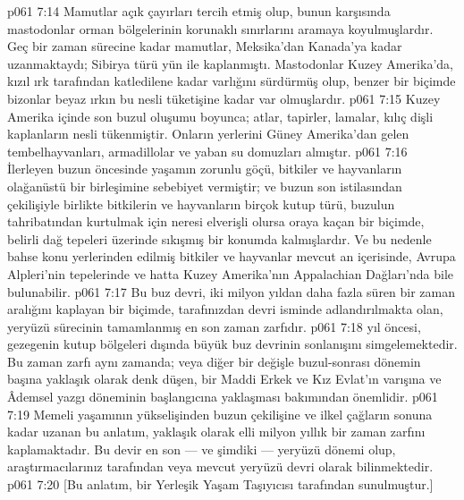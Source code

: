 \vs p061 7:14 Mamutlar açık çayırları tercih etmiş olup, bunun karşısında mastodonlar orman bölgelerinin korunaklı sınırlarını aramaya koyulmuşlardır. Geç bir zaman sürecine kadar mamutlar, Meksika’dan Kanada’ya kadar uzanmaktaydı; Sibirya türü yün ile kaplanmıştı. Mastodonlar Kuzey Amerika’da, kızıl ırk tarafından katledilene kadar varlığını sürdürmüş olup, benzer bir biçimde bizonlar beyaz ırkın bu nesli tüketişine kadar var olmuşlardır.
\vs p061 7:15 Kuzey Amerika içinde son buzul oluşumu boyunca; atlar, tapirler, lamalar, kılıç dişli kaplanların nesli tükenmiştir. Onların yerlerini Güney Amerika’dan gelen tembelhayvanları, armadillolar ve yaban su domuzları almıştır.
\vs p061 7:16 İlerleyen buzun öncesinde yaşamın zorunlu göçü, bitkiler ve hayvanların olağanüstü bir birleşimine sebebiyet vermiştir; ve buzun son istilasından çekilişiyle birlikte bitkilerin ve hayvanların birçok kutup türü, buzulun tahribatından kurtulmak için neresi elverişli olursa oraya kaçan bir biçimde, belirli dağ tepeleri üzerinde sıkışmış bir konumda kalmışlardır. Ve bu nedenle bahse konu yerlerinden edilmiş bitkiler ve hayvanlar mevcut an içerisinde, Avrupa Alpleri’nin tepelerinde ve hatta Kuzey Amerika’nın Appalachian Dağları’nda bile bulunabilir.
\vs p061 7:17 Bu buz devri, iki milyon yıldan daha fazla süren bir zaman aralığını kaplayan bir biçimde, tarafınızdan  devri isminde adlandırılmakta olan, yeryüzü sürecinin tamamlanmış en son zaman zarfıdır.
\vs p061 7:18  yıl öncesi, gezegenin kutup bölgeleri dışında büyük buz devrinin sonlanışını simgelemektedir. Bu zaman zarfı aynı zamanda;  veya diğer bir değişle buzul\hyp{}sonrası dönemin başına yaklaşık olarak denk düşen, bir Maddi Erkek ve Kız Evlat’ın varışına ve Âdemsel yazgı döneminin başlangıcına yaklaşması bakımından önemlidir.
\vs p061 7:19 Memeli yaşamının yükselişinden buzun çekilişine ve ilkel çağların sonuna kadar uzanan bu anlatım, yaklaşık olarak elli milyon yıllık bir zaman zarfını kaplamaktadır. Bu devir en son --- ve şimdiki --- yeryüzü dönemi olup, araştırmacılarınız tarafından  veya mevcut yeryüzü devri olarak bilinmektedir.
\vs p061 7:20 [Bu anlatım, bir Yerleşik Yaşam Taşıyıcısı tarafından sunulmuştur.]
